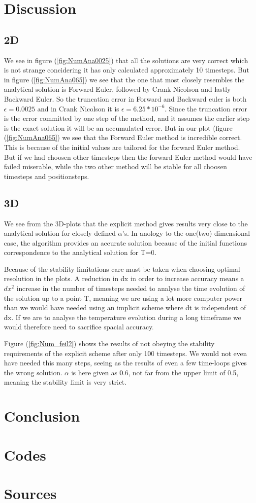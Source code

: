 \documentclass[a4paper,10pt]{article}
\begin{document}
\section{Discussion}
\subsection{2D}
We see in figure (\ref{fig:NumAna0025}) that all the solutions are very correct which is not strange concidering it has only calculated approximately 10 timesteps.
But in figure (\ref{fig:NumAna065}) we see that the one that most closely resembles the analytical solution is Forward Euler, followed by Crank Nicolson and lastly Backward Euler. 
So the truncation error in Forward and Backward euler is both $\epsilon = 0.0025$ and in Crank Nicolson it is $\epsilon = 6.25*10^{-6}$. 
Since the truncation error is the error committed by one step of the method, and it assumes the earlier step is the exact solution it will be an accumulated error.
But in our plot (figure (\ref{fig:NumAna065}) we see that the Forward Euler method is incredible correct. This is because of the initial values are 
tailored for the forward Euler method. But if we had choosen other timesteps then the forward Euler method would have failed miserable, while the
two other method will be stable for all choosen timesteps and positionsteps. 
 

\subsection{3D}
We see from the 3D-plots that the explicit method gives results very close to the analytical solution for closely defined $\alpha$'s. In anology to the one(two)-dimensional case, the algorithm provides an accurate solution because of the initial functions correspondence to the analytical solution for T=0. 

Because of the stability limitations care must be taken when choosing optimal resolution in the plots. A reduction in dx in order to increase accuracy means a $dx^2$ increase in the number of timesteps needed to analyse the time evolution of the solution up to a point T, meaning we are using a lot more computer power than we would have needed using an implicit scheme where dt is independent of dx.
If we are to analyse the temperature evolution during a long timeframe we would therefore need to sacrifice spacial accuracy.

Figure (\ref{fig:Num_feil2}) shows the results of not obeying the stability requirements of the explicit scheme after only 100 timesteps. We would not even have needed this many steps, seeing as the results of even a few time-loops gives the wrong solution. $\alpha$ is here given as 0.6, not far from the upper limit of 0.5, meaning the stability limit is very strict.
\section{Conclusion}

\section{Codes}

\section{Sources}
\end{document}
